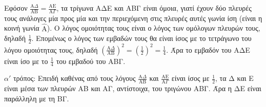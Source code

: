 \begin{alist}
    \item \begin{rlist}
        \item Εφόσον $\frac{\text{A}\Delta}{\text{AB}} = \frac{\text{AE}}{\text{A}\Gamma}$, τα τρίγωνα ΑΔΕ και ΑΒΓ είναι όμοια, γιατί έχουν δύο πλευρές τους ανάλογες μία προς μία και την περιεχόμενη στις πλευρές αυτές γωνία ίση (είναι η κοινή γωνία $\hat{\text{A}}$). Ο λόγος ομοιότητας τους είναι ο λόγος των ομόλογων πλευρών τους, δηλαδή $\frac{1}{2}$.
        Επομένως ο λόγος των εμβαδών τους θα είναι ίσος με το τετράγωνο του λόγου ομοιότητας τους, δηλαδή $\left(\frac{\text{A}\Delta}{\text{AB}}\right)^2 = \left(\frac{1}{2}\right)^2 = \frac{1}{4}$. Άρα το εμβαδόν του ΑΔΕ είναι ίσο με το $\frac{1}{4}$ του εμβαδού του ΑΒΓ. 
        \item $\alpha'$ τρόπος: Επειδή καθένας από τους λόγους $\frac{\text{A}\Delta}{\text{AB}}$ και $\frac{\text{AE}}{\text{A}\Gamma}$ είναι ίσος με $\frac{1}{2}$, τα Δ και Ε είναι μέσα των πλευρών ΑΒ και ΑΓ, αντίστοιχα, του τριγώνου ΑΒΓ. Άρα η ΔΕ είναι παράλληλη με τη ΒΓ.


\end{rlist}
\end{alist}
